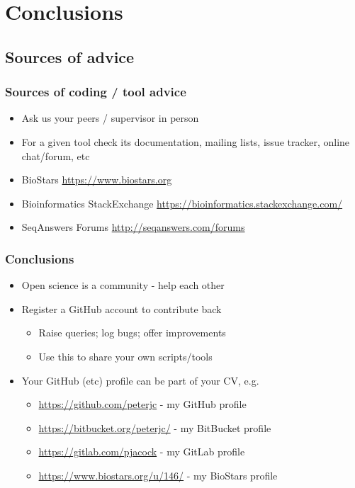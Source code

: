 \section{Conclusions}

\subsection{Sources of advice}

\begin{frame}
  \frametitle{Sources of coding / tool advice}
  \begin{itemize}
    \item Ask us your peers / supervisor in person
    \item For a given tool check its documentation, mailing lists, issue tracker, online chat/forum, etc
    \item BioStars \url{https://www.biostars.org}
    \item Bioinformatics StackExchange \url{https://bioinformatics.stackexchange.com/}
    \item SeqAnswers Forums \url{http://seqanswers.com/forums}
 \end{itemize}
\end{frame}

\begin{frame}
  \frametitle{Conclusions}
  \begin{itemize}
    \item Open science is a community - help each other
    \item Register a GitHub account to contribute back
      \begin{itemize}
        \item Raise queries; log bugs; offer improvements
        \item Use this to share your own scripts/tools
      \end{itemize}
    \item Your GitHub (etc) profile can be part of your CV, e.g.
      \begin{itemize}
        \item \url{https://github.com/peterjc} - my GitHub profile
        \item \url{https://bitbucket.org/peterjc/} - my BitBucket profile
        \item \url{https://gitlab.com/pjacock} - my GitLab profile
        \item \url{https://www.biostars.org/u/146/} - my BioStars profile
      \end{itemize}
 \end{itemize}
\end{frame}

